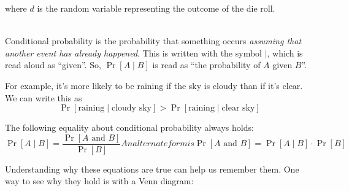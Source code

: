 where $d$ is the random variable representing the outcome of the die roll.

\hfill\\

Conditional probability is the probability that something occurs 
\emph{assuming that another event has already happened}. This is written with the symbol 
$\mid$, which is read aloud as ``given''. So, $\Pr[A \mid B]$ is 
read as ``the probability of $A$ given $B$''.

For example, it's more likely to be raining if the sky is cloudy 
than if it's clear. We can write this as
\[
    \Pr[\text{raining} \mid \text{cloudy sky}] >
    \Pr[\text{raining} \mid \text{clear sky}]
\]

The following equality about conditional probability always holds\footnotemark:
\begin{subequations}\label{eq:conditional}
    \begin{equation}
        \Pr[A \mid B] = \frac{\Pr[A \text{ and } B]}{\Pr[B]}
        \label{eqn:conditional_mid}
    \end{equation}
An alternate form is
    \begin{equation}
        \Pr[A \text{ and } B] = \Pr[A \mid B] \cdot \Pr[B]
        \label{eqn:conditional_and}
    \end{equation}
\end{subequations}

Understanding why these equations are true can help us remember them.
One way to see why they hold is with a Venn diagram:

\begin{center}
\end{center}

